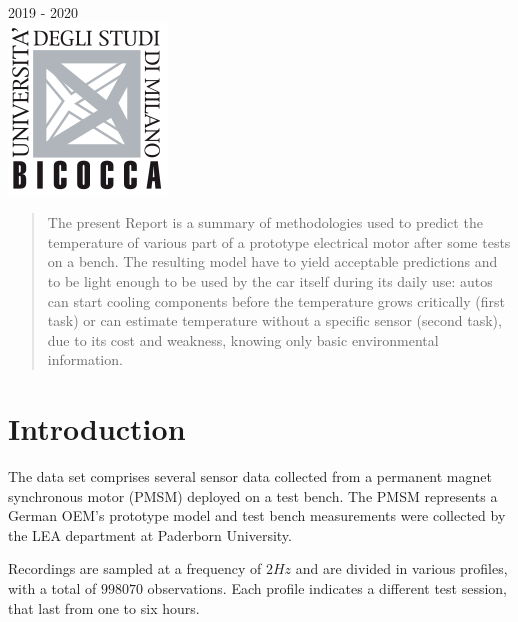 \begin{titlepage}
{\large 2019 - 2020}\\[1cm] %


\includegraphics{imgs/logo.png}\\[1cm] %
 

\vfill %

\end{titlepage}


\begin{abstract}
  The present Report is a summary of methodologies used to predict the temperature of various part of a prototype electrical motor after some tests on a bench. The resulting model have to yield acceptable predictions and to be light enough to be used by the car itself during its daily use: autos can start cooling components before the temperature grows critically (first task) or can estimate temperature without a specific sensor (second task), due to its cost and weakness, knowing only basic environmental information.
\end{abstract}

\section{Introduction}
The data set comprises several sensor data collected from a permanent magnet synchronous motor (PMSM) deployed on a test bench. The PMSM represents a German OEM's prototype model and test bench measurements were collected by the LEA department at Paderborn University.

Recordings are sampled at a frequency of $2Hz$ and are divided in various profiles, with a total of $998070$ observations. Each profile indicates a different test session, that last from one to six hours.

